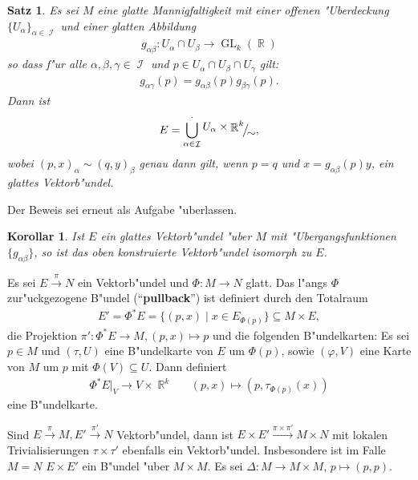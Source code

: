 \documentclass[paper=A4, twoside, chapterprefix=true, bibliography=totoc, headsepline]{scrbook}
\let\temp\phi
\let\phi\varphi
\let\varphi\temp
\let\temp\theta
\let\theta\vartheta
\let\vartheta\temp
\let\temp\epsilon
\let\epsilon\varepsilon
\let\varepsilon\temp
\let\temp\rho
\let\rho\varrho
\let\varrho\temp
\DeclareMathOperator{\R}{\mathbb{R}}
\DeclareMathOperator{\calI}{\mathcal{I}}
\DeclareMathOperator{\Gl}{GL} %
\newcommand{\X}{\times}
\newcommand{\FakRaum}[2]{
	\raisebox{0.7ex}{\ensuremath{#1}}
	\ensuremath{\mkern-3mu}\big/\ensuremath{\mkern-3mu}
	\raisebox{-0.6ex}{\ensuremath{#2}}}
\theoremstyle{plain}
\newtheorem{Satz}[Dfn]{Satz}
\theoremstyle{nonumberplain}
\newtheorem{kor}{Korollar}
\theoremstyle{empty}
\theoremstyle{break}
\newcommand{\CmIndex}[2][]{\ifthenelse{\isempty{#1}}{\index{#2}}{\index{#1}}#2}
\newcommand{\CmMark}[2][]{\textbf{\CmIndex[#1]{#2}}}
\begin{document}
\begin{Satz}\label{satz-5-2}
  Es sei $M$ eine glatte Mannigfaltigkeit mit einer offenen "Uberdeckung $\{U_{\alpha}\}_{\alpha \in \calI}$ und einer glatten Abbildung
  \begin{align*}
    g_{\alpha\beta} \colon U_{\alpha} \cap U_{\beta} \to \Gl_k(\R)
  \end{align*}
so dass f"ur alle $\alpha,\beta,\gamma \in \calI$ und $p \in U_{\alpha} \cap U_{\beta} \cap U_{\gamma}$ gilt:
\begin{align*}
  g_{\alpha\gamma} (p) = g_{\alpha\beta}(p)g_{\beta\gamma}(p).
\end{align*}
Dann ist
	\[ E = \bigcup_{\alpha \in \calI}^{\cdot} \FakRaum{U_{\alpha} \times \R^k}{\sim}, \]
wobei $(p,x)_{\alpha} \sim (q,y)_{\beta}$ genau dann gilt, wenn $p = q$ und $x = g_{\alpha\beta}(p)y$, ein glattes Vektorb"undel.
\end{Satz}

Der Beweis sei erneut als Aufgabe "uberlassen.

\begin{kor}
  Ist $E$ ein glattes Vektorb"undel "uber $M$ mit "Ubergangsfunktionen $\{g_{\alpha\beta}\}$, so ist das oben konstruierte Vektorb"undel isomorph zu $E$.
\end{kor}

Es sei $E \xrightarrow{\pi} N$ ein Vektorb"undel und $\Phi \colon M \to N$ glatt.
Das l"angs $\Phi$ zur"uckgezogene B"undel ("`\CmMark{pullback}"') ist definiert durch den Totalraum
\begin{align*}
  E' = \Phi^{\ast}E = \{(p,x) \mid x \in E_{\Phi(p)}\} \subseteq M \times E,
\end{align*}
die Projektion $\pi' \colon \Phi^{\ast}E \to M, (p,x) \mapsto p$ und die folgenden B"undelkarten:
Es sei $p \in M$ und $(\tau, U)$ eine B"undelkarte von $E$ um $\Phi(p)$, sowie $(\phi,V)$ eine Karte von $M$ um $p$ mit $\Phi(V) \subseteq U$.
Dann definiert 
\begin{align*}
  \Phi^{\ast}E|_V \to V \times \R^k && (p,x) \mapsto \left(p, \tau_{\Phi(p)}(x)\right)
\end{align*}
eine B"undelkarte.

Sind $E \xrightarrow{\pi} M, E' \xrightarrow{\pi'} N$ Vektorb"undel, dann ist $E \times E' \xrightarrow{\pi \times \pi'} M \times N$ mit lokalen Trivialisierungen $\tau \times \tau'$ ebenfalls ein Vektorb"undel.
Insbesondere ist im Falle $M = N$ $E \times E'$ ein B"undel "uber $M \X M$.
Es sei $\Delta \colon M \to M \times M$, $p \mapsto (p,p)$.
\end{document}
